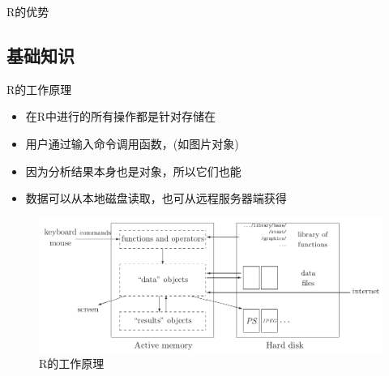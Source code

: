 \documentclass{beamerthemeMono}
\begin{document}
\begin{frame}[t]{\subsecname}{R的优势}
\begin{overlayarea}{\textwidth}{\textheight}
\end{overlayarea}

\end{frame} 

\subsection{基础知识}
\begin{frame}[shrink]{\subsecname}{R的工作原理}
\begin{itemize}
\item 在R中进行的所有操作都是针对存储在
\item 用户通过输入命令调用函数，(如图片对象)
\item 因为分析结果本身也是对象，所以它们也能
\item 数据可以从本地磁盘读取，也可从远程服务器端获得 
\end{itemize} 

\begin{figure}[ht]
  \centering
  \includegraphics[width=0.9\columnwidth]{R_principle.png}
  \caption{R的工作原理}
\end{figure}
\end{frame}
\end{document}
